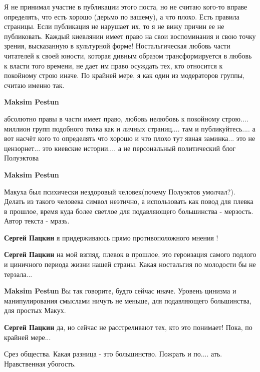 \begin{itemize}
\begin{itemize}
\begin{itemize}

Я не принимал участие в публикации этого поста, но не считаю кого-то вправе
определять, что есть хорошо (дерьмо по вашему), а что плохо. Есть правила
страницы. Если публикация не нарушает их, то я не вижу причин ее не
публиковать. Каждый киевлянин имеет право на свои воспоминания и свою точку
зрения, высказанную в культурной форме! Ностальгическая любовь части читателей
к своей юности, которая дивным образом трансформируется в любовь к власти того
времени, не дает им право осуждать тех, кто относится к покойному строю иначе.
По крайней мере, я как один из модераторов группы, считаю именно так.

\textbf{Maksim Pestun} 

абсолютно правы в части имеет право, любовь нелюбовь к покойному
строю.... миллион групп подобного толка как и личных страниц.... там и
публикуйтесь.... а вот насчёт кого то определять что хорошо и что плохо тут
явная заминка... это не цензорнет... это киевские истории.... а не персональный
политический блог Полуэктова

\end{itemize} %

\textbf{Maksim Pestun} 

Макуха был психически нездоровый человек(почему Полуэктов умолчал?). Делать из
такого человека символ неэтично, а использовать как повод для плевка в прошлое,
время куда более светлое для подавляющего большинства - мерзость. Автор текста
- мразь.

\begin{itemize} %
\textbf{Сергей Пацкин} я придерживаюсь прямо противоположного мнения !

\textbf{Сергей Пацкин} на мой взгляд, плевок в прошлое, это героизация самого подлого и циничного периода жизни нашей страны. Какая ностальгия по молодости бы не терзала...

\textbf{Maksim Pestun} Вы так говорите, будто сейчас иначе. Уровень цинизма и манипулирования смыслами ничуть не меньше, для подавляющего большинства, для простых Макух.

\textbf{Сергей Пацкин} да, но сейчас не расстреливают тех, кто это понимает! Пока, по крайней мере...
\end{itemize} %


Срез общества. Какая разница - это большинство. Пожрать и по.... ать.
Нравственная убогость.


\end{itemize}
\end{itemize}
